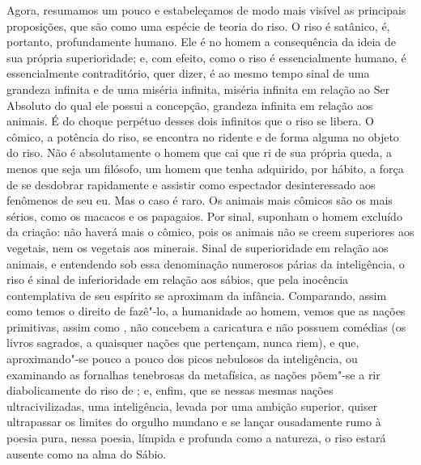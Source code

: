 Agora, resumamos um pouco e estabeleçamos de modo mais visível as
principais proposições, que são como uma espécie de teoria do riso. O
riso é satânico, é, portanto, profundamente humano. Ele é no homem a
consequência da ideia de sua própria superioridade; e, com efeito, como
o riso é essencialmente humano, é essencialmente contraditório, quer
dizer, é ao mesmo tempo sinal de uma grandeza infinita e de uma miséria
infinita, miséria infinita em relação ao Ser Absoluto do qual ele
possui a concepção, grandeza infinita em relação aos animais. É do
choque perpétuo desses dois infinitos que o riso se libera. O cômico, a
potência do riso, se encontra no ridente e de forma alguma no objeto do
riso. Não é absolutamente o homem que cai que ri de sua própria queda,
a menos que seja um filósofo, um homem que tenha adquirido, por hábito,
a força de se desdobrar rapidamente e assistir como espectador
desinteressado aos fenômenos de seu eu. Mas o caso é raro. Os animais
mais cômicos são os mais sérios, como os macacos e os papagaios. Por
sinal, suponham o homem excluído da criação: não haverá mais o cômico,
pois os animais não se creem superiores aos vegetais, nem os vegetais
aos minerais. Sinal de superioridade em relação aos animais, e
entendendo sob essa denominação numerosos párias da inteligência, o
riso é sinal de inferioridade em relação aos sábios, que pela inocência
contemplativa de seu espírito se aproximam da infância. Comparando,
assim como temos o direito de fazê"-lo, a humanidade ao homem, vemos que
as nações primitivas, assim como , não concebem a caricatura e
não possuem comédias (os livros sagrados, a quaisquer nações que
pertençam, nunca riem), e que, aproximando"-se pouco a pouco dos picos
nebulosos da inteligência, ou examinando as fornalhas tenebrosas da
metafísica, as nações põem"-se a rir diabolicamente do riso de ;
e, enfim, que se nessas mesmas nações ultracivilizadas, uma
inteligência, levada por uma ambição superior, quiser ultrapassar os
limites do orgulho mundano e se lançar ousadamente rumo à poesia pura,
nessa poesia, límpida e profunda como a natureza, o riso estará ausente
como na alma do Sábio.

